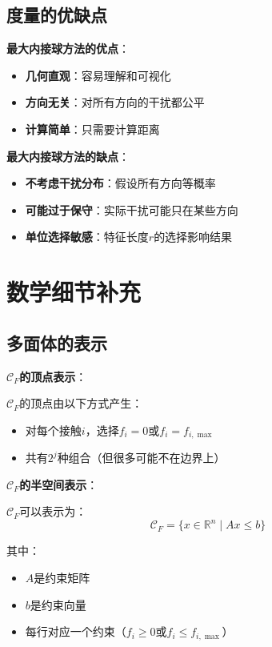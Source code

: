 \documentclass[12pt,a4paper]{article}
\begin{document}
\subsection{度量的优缺点}

\textbf{最大内接球方法的优点}：
\begin{itemize}
\item \textbf{几何直观}：容易理解和可视化
\item \textbf{方向无关}：对所有方向的干扰都公平
\item \textbf{计算简单}：只需要计算距离
\end{itemize}

\textbf{最大内接球方法的缺点}：
\begin{itemize}
\item \textbf{不考虑干扰分布}：假设所有方向等概率
\item \textbf{可能过于保守}：实际干扰可能只在某些方向
\item \textbf{单位选择敏感}：特征长度$r$的选择影响结果
\end{itemize}

\section{数学细节补充}

\subsection{多面体的表示}

\textbf{$\mathcal{C}_F$的顶点表示}：

$\mathcal{C}_F$的顶点由以下方式产生：
\begin{itemize}
\item 对每个接触$i$，选择$f_i = 0$或$f_i = f_{i,\max}$
\item 共有$2^j$种组合（但很多可能不在边界上）
\end{itemize}

\textbf{$\mathcal{C}_F$的半空间表示}：

$\mathcal{C}_F$可以表示为：
\begin{equation}
\mathcal{C}_F = \{x \in \mathbb{R}^n \mid A x \leq b\}
\end{equation}

其中：
\begin{itemize}
\item $A$是约束矩阵
\item $b$是约束向量
\item 每行对应一个约束（$f_i \geq 0$或$f_i \leq f_{i,\max}$）
\end{itemize}
\end{document}
